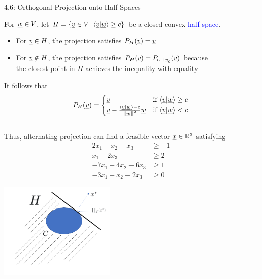 \documentclass[10pt,english,aspectratio=169]{beamer}
\begin{document}
\begin{frame}{4.6: Orthogonal Projection onto Half Spaces}

\vspace{2mm}

For $\underline{w} \in V$, let $H = \{ \underline{v} \in V \,|\, \langle\underline v|\underline w\rangle\geq c \}$ be a closed convex \textcolor{blue}{half space}.

\begin{itemize}
\item For $\underline v\in H$, the projection satisfies $P_{H}(\underline v)=\underline v$ 
\item For $\underline v\notin H$, the projection satisfies $P_{H}(\underline v)=P_{U+\underline v_{0}}(\underline v)$ because \\ the closest point in $H$ achieves the inequality with equality
\end{itemize}

\vspace{2mm}

It follows that \vspace{-2.5mm}
\begin{equation*}
P_{H}(\underline v)=\begin{cases}
\underline v & \text{if }\langle\underline v|\underline w\rangle\geq c\\
\underline v-\frac{\left\langle \underline v|\underline w\right\rangle -c}{\left\Vert \underline w\right\Vert ^{2}}\underline w & \text{if }\langle\underline v|\underline w\rangle<c
\end{cases}\label{eq:proj_ineq}
\end{equation*}

\vspace{1mm}
\hrule
\vspace{4mm}
Thus, alternating projection can find a feasible vector $\underline{x}\in \mathbb{R}^3$ satisfying \vspace{-1mm}
{\small
\begin{align*}
2x_{1}-x_{2}+x_{3} & \geq-1\\
x_{1}+2x_{3} & \geq2\\
-7x_{1}+4x_{2}-6x_{3} & \geq1\\
-3x_{1}+x_{2}-2x_{3} & \geq0
\end{align*}
}
\vspace{-3mm}

\vspace{-1.1in}
\hspace*{3.7in}
\includegraphics[width=2.2in]{figures/ch4_halfspace}

\end{frame}
\end{document}
